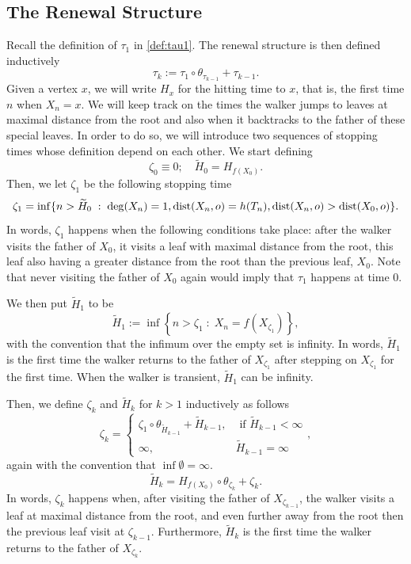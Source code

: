 \documentclass[a4paper]{amsart}
\newcommand{\hitfetak}{\widetilde{H}}
\newcommand{\Lbrace}{\left\lbrace}
\newcommand{\Rbrace}{\right\rbrace}
\newcommand{\D}[1]{{\rm dist}(X_{#1},o)}
\newcommand{\Deg}[1]{{\rm deg}(X_{#1})}
\begin{document}
\subsection{The Renewal Structure}
Recall the definition of $\tau_1$ in \eqref{def:tau1}. The renewal structure is then defined inductively
\begin{equation}\label{eq:tauk}
\tau_k := \tau_1 \circ \theta_{\tau_{k-1}} + \tau_{k-1}.
\end{equation}
Given a vertex $x$, we will write $H_x$ for the hitting time to $x$, that is, the first time $n$ when $X_n = x$. We will keep track on the times the walker jumps to leaves at maximal distance from the root and also when it backtracks to the father of these special leaves. In order to do so, we will introduce two sequences of stopping times whose definition depend on each other. We start defining 
$$
\zeta_0 \equiv 0; \quad \hitfetak_0 = H_{f(X_0)}.
$$
Then, we let $\zeta_1$ be the following stopping time
$$
\zeta_1 = \inf \{ n> \hitfetak_0 \; : \;\Deg{n} = 1, \D{n} = h(T_n), \D{n}>\D{0} \}.
$$
In words, $\zeta_1$ happens when the following conditions take place: after the walker visits the father of $X_0$, it visits a leaf with maximal distance from the root, this leaf also having a greater distance from the root than the previous leaf, $X_0$. Note that never visiting the father of $X_0$ again would imply that $\tau_1$ happens at time $0$.

We then put $\hitfetak_1$ to be
\begin{equation}
    \hitfetak_1 := \inf\Lbrace n > \zeta_1 \; : \; X_n = f\left( X_{\zeta_1} \right)\Rbrace,
\end{equation}
with the convention that the infimum over the empty set is infinity. In words, $\hitfetak_1$ is the first time the walker returns to the father of $X_{\zeta_1} $ after stepping on $X_{\zeta_1} $ for the first time. When the walker is transient, $\hitfetak_1$ can be infinity.

Then, we define $\zeta_k$ and $\hitfetak_k$ for $k>1$ inductively as follows
\begin{equation}
    \label{eq:etakdef}
    \zeta_k = \begin{cases}
                \zeta_1 \circ \theta_{\hitfetak_{k-1}} + \hitfetak_{k-1}, & \text{ if } \hitfetak_{k-1} <\infty  \\
                \infty, & \hitfetak_{k-1} = \infty 
            \end{cases},
\end{equation}
again with the convention that $\inf\emptyset = \infty$.
\begin{equation}
    \label{eq:hitfkdef}
    \hitfetak_k = H_{f(X_0)} \circ \theta_{\zeta_{k}} + \zeta_{k}. 
\end{equation}
In words, $\zeta_k$ happens when, after visiting the father of $X_{\zeta_{k-1}}$, the walker visits a leaf at maximal distance from the root, and even further away from the root then the previous leaf visit at $\zeta_{k-1}$. Furthermore, $\hitfetak_k$ is the first time the walker returns to the father of $X_{\zeta_{k}}$.
\end{document}
